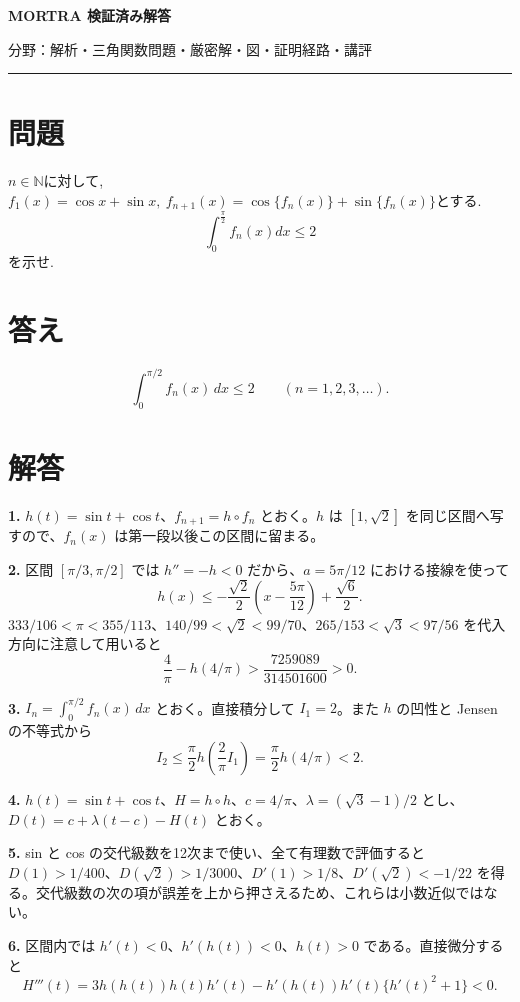 \documentclass[uplatex,dvipdfmx,11pt]{jsarticle}
\begin{document}
\begin{center}
{\LARGE\bfseries MORTRA 検証済み解答\par}
\vspace{1mm}
{\small 分野：解析・三角関数\qquad 問題・厳密解・図・証明経路・講評}
\end{center}
\vspace{1mm}
\hrule
\vspace{5mm}

\section*{問題}
$n\in \mathbb{N}$に対して,\ $f_1(x)=\cos x+\sin x,\ f_{n+1}(x)=\cos \{f_n(x)\} +\sin \{f_n(x)\}$とする.\\
\[
\displaystyle\int_0^{\frac{\pi}2}f_n(x)dx\le 2
\]
を示せ.

\section*{答え}
\[\int_0^{\pi/2}f_{n}(x)\,dx\le2\qquad(n=1,2,3,\ldots).\]

\section*{解答}
\textbf{1.} \(h(t)=\sin t+\cos t\)、\(f_{n+1}=h\circ f_n\) とおく。\(h\) は \([1,\sqrt2]\) を同じ区間へ写すので、\(f_n(x)\) は第一段以後この区間に留まる。

\textbf{2.} 区間 \([\pi/3,\pi/2]\) では \(h''=-h<0\) だから、\(a=5\pi/12\) における接線を使って \[h(x)\le-\frac{\sqrt2}{2}\left(x-\frac{5\pi}{12}\right)+\frac{\sqrt6}{2}.\] \(333/106<\pi<355/113\)、\(140/99<\sqrt2<99/70\)、\(265/153<\sqrt3<97/56\) を代入方向に注意して用いると \[\frac4\pi-h(4/\pi)>\frac{7259089}{314501600}>0.\]

\textbf{3.} \(I_n=\int_0^{\pi/2}f_{n}(x)\,dx\) とおく。直接積分して \(I_1=2\)。また \(h\) の凹性と Jensen の不等式から \[I_2\le\frac\pi2h\left(\frac2\pi I_1\right)=\frac\pi2h(4/\pi)<2.\]

\textbf{4.} \(h(t)=\sin t+\cos t\)、\(H=h\circ h\)、\(c=4/\pi\)、\(\lambda=(\sqrt3-1)/2\) とし、\(D(t)=c+\lambda(t-c)-H(t)\) とおく。

\textbf{5.} sin と cos の交代級数を12次まで使い、全て有理数で評価すると \(D(1)>1/400\)、\(D(\sqrt2)>1/3000\)、\(D'(1)>1/8\)、\(D'(\sqrt2)<-1/22\) を得る。交代級数の次の項が誤差を上から押さえるため、これらは小数近似ではない。

\textbf{6.} 区間内では \(h'(t)<0\)、\(h'(h(t))<0\)、\(h(t)>0\) である。直接微分すると \[H'''(t)=3h(h(t))h(t)h'(t)-h'(h(t))h'(t)\{h'(t)^2+1\}<0.\]
\end{document}

